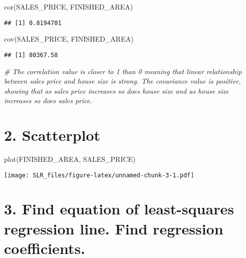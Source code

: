 \documentclass[
]{article}
\newenvironment{Shaded}{\begin{snugshade}}{\end{snugshade}}
\newcommand{\CommentTok}[1]{\textcolor[rgb]{0.56,0.35,0.01}{\textit{#1}}}
\newcommand{\FunctionTok}[1]{\textcolor[rgb]{0.00,0.00,0.00}{#1}}
\newcommand{\NormalTok}[1]{#1}
\begin{document}
\begin{Shaded}
\begin{Highlighting}[]
\FunctionTok{cor}\NormalTok{(SALES\_PRICE, FINISHED\_AREA)}
\end{Highlighting}
\end{Shaded}

\begin{verbatim}
## [1] 0.8194701
\end{verbatim}

\begin{Shaded}
\begin{Highlighting}[]
\FunctionTok{cov}\NormalTok{(SALES\_PRICE, FINISHED\_AREA)}
\end{Highlighting}
\end{Shaded}

\begin{verbatim}
## [1] 80367.58
\end{verbatim}

\begin{Shaded}
\begin{Highlighting}[]
\CommentTok{\# The correlation value is closer to 1 than 0 meaning that linear relationship between sales price and house size is strong. The covariance value is positive, showing that as sales price increases so does house size and as house size increases so does sales price. }
\end{Highlighting}
\end{Shaded}

\hypertarget{scatterplot}{%
\section{2. Scatterplot}\label{scatterplot}}

\begin{Shaded}
\begin{Highlighting}[]
\FunctionTok{plot}\NormalTok{(FINISHED\_AREA, SALES\_PRICE)}
\end{Highlighting}
\end{Shaded}

\texttt{[image: SLR\_files/figure-latex/unnamed-chunk-3-1.pdf]}

\hypertarget{find-equation-of-least-squares-regression-line.-find-regression-coefficients.}{%
\section{3. Find equation of least-squares regression line. Find
regression
coefficients.}\label{find-equation-of-least-squares-regression-line.-find-regression-coefficients.}}
\end{document}
